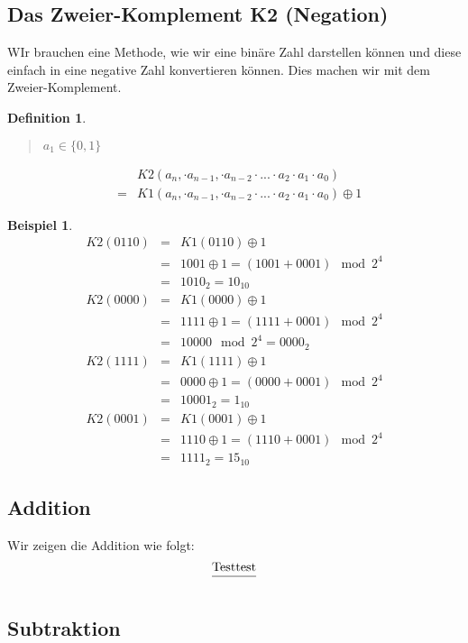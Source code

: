 \documentclass{report}
\newtheorem{mydef}{Definition}
\newtheorem{myexample}{Beispiel}
\begin{document}
\subsection{Das Zweier-Komplement K2 (Negation)}
WIr brauchen eine Methode, wie wir eine binäre Zahl darstellen können und diese einfach in eine negative Zahl konvertieren können. Dies machen wir mit dem Zweier-Komplement.
\begin{mydef}\begin{quote}$a_1 \in \{0, 1\}$\end{quote}\begin{eqnarray}
& &K2(a_n, \cdot a_{n-1}, \cdot a_{n-2} \cdot ... \cdot a_2 \cdot a_1 \cdot a_0) \nonumber \\
&=&K1(a_n, \cdot a_{n-1}, \cdot a_{n-2} \cdot ... \cdot a_2 \cdot a_1 \cdot a_0) \oplus 1 \end{eqnarray}\end{mydef}
\begin{myexample}\begin{eqnarray}K2(0110) &=& K1(0110) \oplus 1 \nonumber \\
&=&1001 \oplus 1 = (1001 + 0001) \mod 2^4 \nonumber \\
&=&1010_2 = 10_{10}\end{eqnarray}
\begin{eqnarray}K2(0000) &=& K1(0000) \oplus 1 \nonumber \\
&=&1111 \oplus 1 = (1111 + 0001) \mod 2^4 \nonumber \\
&=&10000 \mod 2^4 = 0000_2\end{eqnarray}
\begin{eqnarray}K2(1111) &=& K1(1111) \oplus 1 \nonumber \\
&=&0000 \oplus 1 = (0000 + 0001) \mod 2^4 \nonumber \\
&=&10001_2 = 1_{10}\end{eqnarray}
\begin{eqnarray}K2(0001) &=& K1(0001) \oplus 1 \nonumber \\
&=&1110 \oplus 1 = (1110 + 0001) \mod 2^4 \nonumber \\
&=&1111_2 = 15_{10}\end{eqnarray}\end{myexample}
\subsection{Addition}
Wir zeigen die Addition wie folgt:
\begin{equation}\frac{\mbox{Test\\test}}{}\end{equation}
\subsection{Subtraktion}
\end{document}
